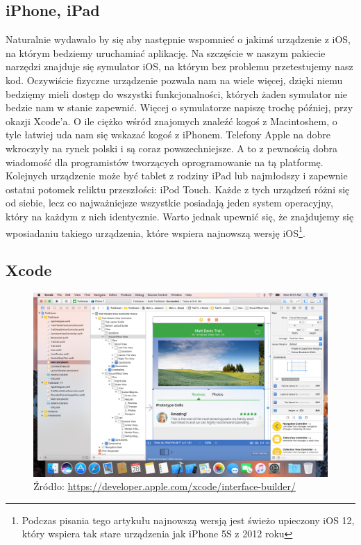 \documentclass{article}
\begin{document}
\subsection*{iPhone, iPad}
Naturalnie wydawało by się aby następnie wspomnieć o jakimś urządzenie z iOS, na
którym bedziemy uruchamiać aplikację. Na szczęście w naszym pakiecie narzędzi 
znajduje się symulator iOS, na którym bez problemu przetestujemy nasz kod.
Oczywiście fizyczne urządzenie pozwala nam na wiele więcej, dzięki niemu bedzięmy
mieli dostęp do wszystki funkcjonalności, których żaden symulator nie bedzie nam 
w stanie zapewnić. Więcej o symulatorze napiszę trochę później, przy okazji Xcode'a.
O ile ciężko wśród znajomych znaleźć kogoś z Macintoshem, o tyle łatwiej uda nam 
się wskazać kogoś z iPhonem. Telefony Apple na dobre wkroczyły na rynek polski i 
są coraz powszechniejsze. A to z pewnością dobra wiadomość dla programistów tworzących
oprogramowanie na tą platformę. Kolejnych urządzenie może być tablet z rodziny iPad
lub najmłodszy i zapewnie ostatni potomek reliktu przeszłości: iPod Touch. Każde
z tych urządzeń różni się od siebie, lecz co najważniejsze wszystkie posiadają 
jeden system operacyjny, który na każdym z nich identycznie. Warto jednak upewnić
się, że znajdujemy się wposiadaniu takiego urządzenia, które wspiera najnowszą
wersję iOS\footnote{Podczas pisania tego artykułu najnowszą wersją jest świeżo 
upieczony iOS 12, który wspiera tak stare urządzenia jak iPhone 5S z 2012 roku}.

\subsection*{Xcode}

\begin{figure}[h]
\centering
\includegraphics[width=12cm]{interface-builder_2x}
\caption{Źródło: \url{https://developer.apple.com/xcode/interface-builder/}}
\end{figure}
\end{document}

